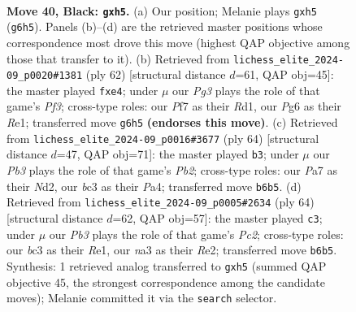 \documentclass[11pt]{article}
\begin{document}
\clearpage

\begin{figure}[p]\centering
\begin{subfigure}{0.46\textwidth}\centering
\resizebox{\linewidth}{!}{%
\newchessgame
\chessboard[
  setfen={1rr5/pn3p1k/1p2p1pp/7P/2P5/N1B1P3/PR3PP1/5K1R b - - 2 40},
  showmover=false,
  pgfstyle=straightmove, color=movearrow, markmove={g6-h5}
]}
\caption{}
\end{subfigure}\hfill
\begin{subfigure}{0.46\textwidth}\centering
\resizebox{\linewidth}{!}{%
\newchessgame
\chessboard[
  setfen={4r3/1b1n1pk1/p7/1p5p/2pPp2P/P4PP1/1P3K2/3RR3 w - - 0 32},
  showmover=false,
  pgfstyle=straightmove, color=movearrow, markmove={f3-e4}
]}
\caption{}
\end{subfigure}
\\[4pt]
\begin{subfigure}{0.46\textwidth}\centering
\resizebox{\linewidth}{!}{%
\newchessgame
\chessboard[
  setfen={4r3/1p3k2/1r1b2pp/p1pPpp2/P1P3P1/7P/1P1NRPK1/4R3 w - - 8 33},
  showmover=false,
  pgfstyle=straightmove, color=movearrow, markmove={b2-b3}
]}
\caption{}
\end{subfigure}\hfill
\begin{subfigure}{0.46\textwidth}\centering
\resizebox{\linewidth}{!}{%
\newchessgame
\chessboard[
  setfen={4r3/1kp5/2p1r1pp/pp2P3/P5P1/1P5P/2P1R3/4R1K1 w - - 0 33},
  showmover=false,
  pgfstyle=straightmove, color=movearrow, markmove={c2-c3}
]}
\caption{}
\end{subfigure}
\caption{\textbf{Move 40, Black: \texttt{gxh5}.} (a) Our position; Melanie plays \texttt{gxh5} (\texttt{g6h5}). Panels (b)--(d) are the retrieved master positions whose correspondence most drove this move (highest QAP objective among those that transfer to it). (b) Retrieved from \texttt{lichess\_elite\_2024-09\_p0020\#1381} (ply 62) [structural distance $d$=61, QAP obj=45]: the master played \texttt{fxe4}; under $\mu$ our \emph{Pg3} plays the role of that game's \emph{Pf3}; cross-type roles: our \emph{P}f7 as their \emph{R}d1, our \emph{P}g6 as their \emph{R}e1; transferred move \texttt{g6h5} \textbf{(endorses this move)}. (c) Retrieved from \texttt{lichess\_elite\_2024-09\_p0016\#3677} (ply 64) [structural distance $d$=47, QAP obj=71]: the master played \texttt{b3}; under $\mu$ our \emph{Pb3} plays the role of that game's \emph{Pb2}; cross-type roles: our \emph{P}a7 as their \emph{N}d2, our \emph{b}c3 as their \emph{P}a4; transferred move \texttt{b6b5}. (d) Retrieved from \texttt{lichess\_elite\_2024-09\_p0005\#2634} (ply 64) [structural distance $d$=62, QAP obj=57]: the master played \texttt{c3}; under $\mu$ our \emph{Pb3} plays the role of that game's \emph{Pc2}; cross-type roles: our \emph{b}c3 as their \emph{R}e1, our \emph{n}a3 as their \emph{R}e2; transferred move \texttt{b6b5}. Synthesis: 1 retrieved analog transferred to \texttt{gxh5} (summed QAP objective 45, the strongest correspondence among the candidate moves); Melanie committed it via the \texttt{search} selector.}
\label{fig:thought-m79}
\end{figure}
\end{document}
